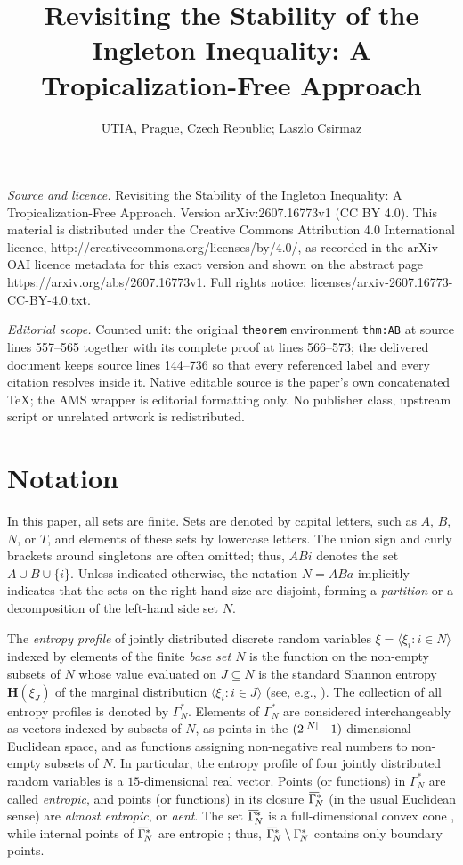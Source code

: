 \documentclass[10pt,a4paper]{amsart}
\def\H{\mathbf H}
\def\m#1{\mskip 1.5mu{#1}\mskip 1.5mu}
\def\<{\langle}\def\>{\rangle}
\def\Ga#1{\Gamma^*_{\!#1}}
\def\barGamma{\mkern1mu\overline{\hbox{$\mkern-1mu\Gamma\mkern4mu$}}\mkern-4mu}
\def\clGa#1{\barGamma^*_{\!#1}}
\begin{document}
\title[Revisiting the Stability of the Ingleton Inequality: A Tropi]{Revisiting the Stability of the Ingleton Inequality: A Tropicalization-Free Approach}
\author{UTIA, Prague, Czech Republic; Laszlo Csirmaz}
\date{}
\maketitle
\noindent\emph{Source and licence.} Revisiting the Stability of the Ingleton Inequality: A Tropicalization-Free Approach. Version arXiv:2607.16773v1 (CC BY 4.0). This material is distributed under the Creative Commons Attribution 4.0 International licence, http://creativecommons.org/licenses/by/4.0/, as recorded in the arXiv OAI licence metadata for this exact version and shown on the abstract page https://arxiv.org/abs/2607.16773v1. Full rights notice: licenses/arxiv-2607.16773-CC-BY-4.0.txt.\par\smallskip
\noindent\textit{Editorial scope.} Counted unit: the original \texttt{theorem} environment \texttt{thm:AB} at source lines 557--565 together with its complete proof at lines 566--573; the delivered document keeps source lines 144--736 so that every referenced label and every citation resolves inside it. Native editable source is the paper's own concatenated TeX; the AMS wrapper is editorial formatting only. No publisher class, upstream script or unrelated artwork is redistributed.
\section{Notation}\label{sec:defs}

In this paper, all sets are finite. Sets are denoted by capital letters,
such as $A$, $B$, $N$, or $T$, and elements of these sets by lowercase
letters. The union sign and curly brackets around singletons are often
omitted; thus, $ABi$ denotes the set $A\cup B\cup\{i\}$. Unless indicated
otherwise, the notation $N=ABa$ implicitly indicates that the sets on the
right-hand size are disjoint, forming a \emph{partition} or a decomposition
of the left-hand side set $N$.

The \emph{entropy profile} of jointly distributed discrete random variables
$\xi =\<\xi_i:i\in N\>$ indexed by elements of the finite \emph{base set
$N$} is the function on the non-empty subsets of $N$ whose value evaluated
on $J\subseteq N$ is the standard Shannon entropy $\H(\xi_J)$ of the
marginal distribution $\<\xi_i:i\in J\>$ (see, e.g., \cite{yeung-book}). The
collection of all entropy profiles is denoted by $\Ga N$. Elements of $\Ga
N$ are considered interchangeably as vectors indexed by subsets of $N$, as
points in the $(2^{|N|}\m-1)$-dimensional Euclidean space, and as
functions assigning non-negative real numbers to non-empty subsets of $N$.
In particular, the entropy profile of four jointly distributed random
variables is a $15$-dimensional real vector. Points (or functions) in $\Ga
N$ are called \emph{entropic}, and points (or functions) in its closure
$\clGa N$ (in the usual Euclidean sense) are \emph{almost entropic}, or
\emph{aent}. The set $\clGa N$ is a full-dimensional convex cone
\cite{yeung-book}, while internal points of $\clGa N$ are entropic
\cite{fmtwocon}; thus, $\clGa N\setminus \Ga N$ contains only boundary
points.
\end{document}
